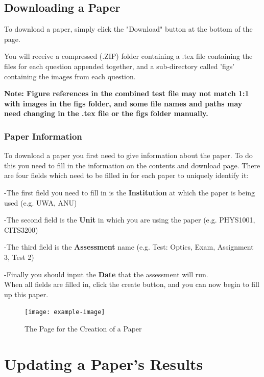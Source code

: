 \documentclass[12pt, a4paper, titlepage]{book}
\begin{document}
\section{Downloading a Paper}
To download a paper, simply click the "Download" button at the bottom of the page. \par You will receive a compressed (.ZIP) folder containing a .tex file containing the files for each question appended together, and a sub-directory called 'figs' containing the images from each question.
\par \textbf{Note: Figure references in the combined test file may not match 1:1 with images in the figs folder, and some file names and paths may need changing in the .tex file or the figs folder manually.}
\subsection{Paper Information}
To download a paper you first need to give information about the paper. To do this you need to fill in the information on the contents and download page. 	There are four fields which need to be filled in for each paper to uniquely identify it:
\small
\par -The first field you need to fill in is the \textbf{Institution }at which the paper is being used (e.g. UWA, ANU)
\par -The second field is the \textbf{Unit} in which you are using the paper (e.g. PHYS1001, CITS3200)
\par -The third field is the \textbf{Assessment} name (e.g. Test: Optics, Exam, Assignment 3, Test 2)
\par -Finally you should input the \textbf{Date} that the assessment will run.
\normalsize
\\ When all fields are filled in, click the create button, and you can now begin to fill up this paper.
\begin{figure}[htp]
\centering
\texttt{[image: example-image]}
\caption{The Page for the Creation of a Paper}
\end{figure}



\chapter{Updating a Paper's Results}\label{ch:upres}
\end{document}
